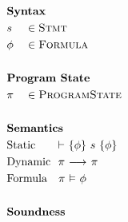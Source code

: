 \begin{figure}
    \begin{alignat*}{3}
    	 & \rlap{\textbf{Syntax}}                        &  &                      & ~ \\
    	 & s                                             &  & \in \setStmt         &  \\
    	 & \phi                                          &  & \in \setFormula      &  \\
    	 &  \\
    	 & \rlap{\textbf{Program State}}                 &  &                      &  \\
    	 & \pi                                           &  & \in \setProgramState &  \\
    	 &  \\
    	 & \rlap{\textbf{Semantics}}                     &  &                      &  \\
    	 & \rlap{Static  ~~~~$\thoare{}{\phi}{s}{\phi}$} &  &                      &  \\
    	 & \rlap{Dynamic ~$\sstep{\pi}{\pi}$}            &  &                      &  \\
    	 & \rlap{Formula ~~$\evalphiGen{\pi}{\phi}$}     &  &                      &  \\
         & ~ \\
         & \rlap{\textbf{Soundness}}                     &  &                      &  \\
    \end{alignat*}


\end{figure}
